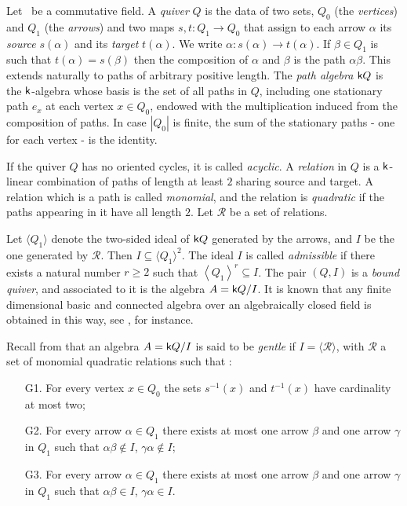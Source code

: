 \documentclass{amsart}
\theoremstyle{plain}
\theoremstyle{definition}
\begin{document}
Let {{}} \  be a commutative field. A \emph{quiver} $Q$ is the data of two sets, $Q_0$ (the \textit{vertices}) and $Q_1$ (the \textit{arrows}) and two maps {${s,t}\colon {Q_1} \to {Q_0}$} that assign to each arrow ${\alpha}$ its \textit{source} $s({\alpha})$ and its \textit{target} $t({\alpha})$. We write {${\alpha}\colon {s({\alpha})} \to {t({\alpha})}$}.  If ${\beta}\in Q_1$ is such that $t({\alpha})=s({\beta})$ then the composition of ${\alpha}$ and ${\beta}$ is the path ${\alpha}{\beta}$. This extends naturally to paths of arbitrary positive length. The \emph{path algebra} ${{\normalfont{\textsf{k}}}} Q$ is the ${{\normalfont{\textsf{k}}}}$-algebra whose basis is the set of all paths in $Q$, including one stationary path $e_x$ at each vertex $x\in Q_0$, endowed with the  multiplication induced from the composition of paths. In case $|Q_0|$ is finite, the sum of the stationary paths  - one for each vertex - is the identity.

If the quiver $Q$ has no oriented cycles, it is called \emph{acyclic}. A \emph{relation} in $Q$ is a ${{\normalfont{\textsf{k}}}}$-linear combination of paths of length at least $2$ sharing source and target.  A relation which is a path is called \emph{monomial}, and the relation is \emph{quadratic} if the paths appearing in it have all length $2$. Let $\mathcal{R}$ be a set of relations.
 
 Let $\langle Q_1 \rangle$ denote the two-sided ideal of ${{\normalfont{\textsf{k}}}} Q$ generated by the arrows, and $I$ be the one generated by $\mathcal{R}$. Then $I\subseteq \langle Q_1\rangle ^2$.
 The ideal $I$ is called \emph{admissible} if there exists a natural number $r\geqslant 2$ such that $\left\langle Q_1 \right\rangle^r \subseteq I$. The pair $(Q,I)$ is a \emph{bound quiver}, and associated to it is the algebra $A={{\normalfont{\textsf{k}}}} Q/I$.
It is known that any finite dimensional basic and connected algebra over an algebraically closed field is obtained in this way, see \cite{ASS06}, for instance.

Recall from \cite{AS87} that an algebra  $A= {{\normalfont{\textsf{k}}}} Q/I$ is said to be \emph{gentle} if  $I=\langle \mathcal{R} \rangle $, with $\mathcal{R}$ a set of monomial quadratic relations such that :
\begin{enumerate}
 \item[G1.] For every vertex $x\in Q_0$ the sets $s^{-1}(x)$ and $t^{-1}(x)$ have cardinality at most two;
 \item[G2.] For every arrow ${\alpha}\in Q_1$ there exists at most one arrow ${\beta}$ and one arrow $\gamma$ in $ Q_1$ such that ${\alpha}{\beta}\not\in I$, $\gamma{\alpha}\not\in I $;
 \item[G3.] For every arrow ${\alpha}\in Q_1$ there exists at most one arrow ${\beta}$ and one arrow $\gamma$ in $Q_1$ such that ${\alpha}{\beta}\in I$, $\gamma{\alpha}\in I$.
\end{enumerate}
\end{document}
